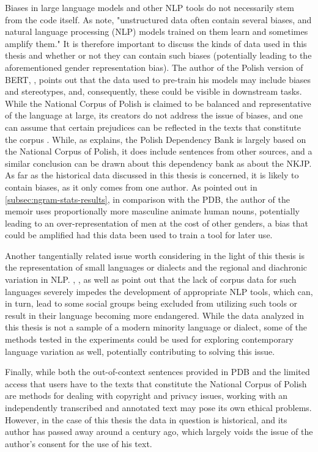 Biases in large language models and other NLP tools do not necessarily stem from the code itself. As \citet{garimella-etal-2021-intelligent} note, "unstructured data often contain several biases, and natural language processing (NLP) models trained on them learn and sometimes amplify them." It is therefore important to discuss the kinds of data used in this thesis and whether or not they can contain such biases (potentially leading to the aforementioned gender representation bias). The author of the Polish version of BERT, \citet{kłeczek_2021}, points out that the data used to pre-train his models may include biases and stereotypes, and, consequently, these could be visible in downstream tasks. While the National Corpus of Polish is claimed to be balanced and representative of the language at large, its creators do not address the issue of biases, and one can assume that certain prejudices can be reflected in the texts that constitute the corpus \citep{nkjp}. While, as \citet{wroblewska-2018-extended} explains, the Polish Dependency Bank is largely based on the National Corpus of Polish, it does include sentences from other sources, and a similar conclusion can be drawn about this dependency bank as about the NKJP. As far as the historical data discussed in this thesis is concerned, it is likely to contain biases, as it only comes from one author. As pointed out in \autoref{subsec:ngram-stats-results}, in comparison with the PDB, the author of the memoir uses proportionally more masculine animate human nouns, potentially leading to an over-representation of men at the cost of other genders, a bias that could be amplified had this data been used to train a tool for later use.  

Another tangentially related issue worth considering in the light of this thesis is the representation of small languages or dialects and the regional and diachronic variation in NLP. \citet{mcenery-etal-2000-corpus}, \citet{soria-etal-2016-fostering}, as well as  \citet{hovy-2018-social} point out that the lack of corpus data for such languages severely impedes the development of appropriate NLP tools, which can, in turn, lead to some social groups being excluded from utilizing such tools or result in their language becoming more endangered. While the data analyzed in this thesis is not a sample of a modern minority language or dialect, some of the methods tested in the experiments could be used for exploring contemporary language variation as well, potentially contributing to solving this issue. 

Finally, while both the out-of-context sentences provided in PDB and the limited access that users have to the texts that constitute the National Corpus of Polish are methods for dealing with copyright and privacy issues, working with an independently transcribed and annotated text may pose its own ethical problems. However, in the case of this thesis the data in question is historical, and its author has passed away around a century ago, which largely voids the issue of the author's consent for the use of his text. 



